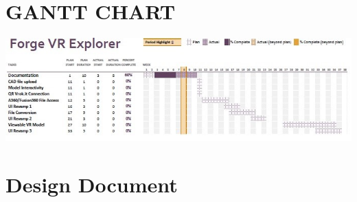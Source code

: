 \documentclass[letterpaper, 10pt, draftclsnofoot, compsoc, onecolumn]{IEEEtran}
\makeatletter
\def\subsubsection{\@startsection{subsubsection}%
                                 {3}%
                                 {\z@}%
                                 {1ex plus 0.1ex minus 0.1ex}%
                                 {1ex}%
                                 {\normalfont\normalsize}}%
\makeatother
\begin{document}

\clearpage
\section[GANTT CHART]{\rmfamily\bfseries\color{black}
GANTT CHART}

\begin{center}
	\includegraphics[scale=0.8]{GanttChart.jpg}
\end{center}

\newpage
\section{Design Document}
\thispagestyle{FirstPage}
\end{document}

